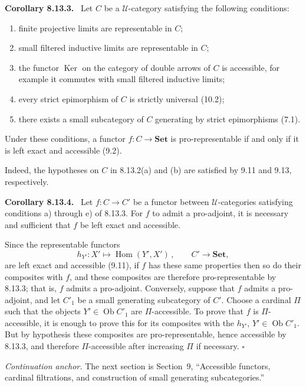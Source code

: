 \documentclass[11pt]{article}
\newcommand{\U}{\mathcal{U}}
\newcommand{\Set}{\mathbf{Set}}
\newcommand{\Ob}{\operatorname{Ob}}
\newcommand{\Hom}{\operatorname{Hom}}
\newcommand{\Ker}{\operatorname{Ker}}
\newcommand{\qedtext}{\hfill\(\square\)}
\newenvironment{statement}[1]{\par\medskip\noindent\textbf{#1.}\ }{\par\medskip}
\begin{document}
\begin{statement}{Corollary 8.13.3}
Let $C$ be a $\U$-category satisfying the following conditions:
\begin{enumerate}[label=\alph*)]
\item finite projective limits are representable in $C$;
\item small filtered inductive limits are representable in $C$;
\item the functor $\Ker$ on the category of double arrows of $C$ is accessible, for example it commutes with small filtered inductive limits;
\item every strict epimorphism of $C$ is strictly universal (10.2);
\item there exists a small subcategory of $C$ generating by strict epimorphisms (7.1).
\end{enumerate}
Under these conditions, a functor $f:C\to\Set$ is pro-representable if and only if it is left exact and accessible (9.2).
\end{statement}

Indeed, the hypotheses on $C$ in 8.13.2(a) and (b) are satisfied by 9.11 and 9.13, respectively.

\begin{statement}{Corollary 8.13.4}
Let $f:C\to C'$ be a functor between $\U$-categories satisfying conditions a) through e) of 8.13.3. For $f$ to admit a pro-adjoint, it is necessary and sufficient that $f$ be left exact and accessible.
\end{statement}

Since the representable functors
\[
 h_{Y'}:X'\longmapsto \Hom(Y',X')\,,\qquad C'\to\Set,
\]
are left exact and accessible (9.11), if $f$ has these same properties then so do their composites with $f$, and these composites are therefore pro-representable by 8.13.3; that is, $f$ admits a pro-adjoint. Conversely, suppose that $f$ admits a pro-adjoint, and let $C'_1$ be a small generating subcategory of $C'$. Choose a cardinal $\Pi$ such that the objects $Y'\in\Ob C'_1$ are $\Pi$-accessible. To prove that $f$ is $\Pi$-accessible, it is enough to prove this for its composites with the $h_{Y'}$, $Y'\in\Ob C'_1$. But by hypothesis these composites are pro-representable, hence accessible by 8.13.3, and therefore $\Pi$-accessible after increasing $\Pi$ if necessary. \qedtext

\bigskip
\noindent\emph{Continuation anchor.} The next section is Section~9, ``Accessible functors, cardinal filtrations, and construction of small generating subcategories.''
\end{document}
